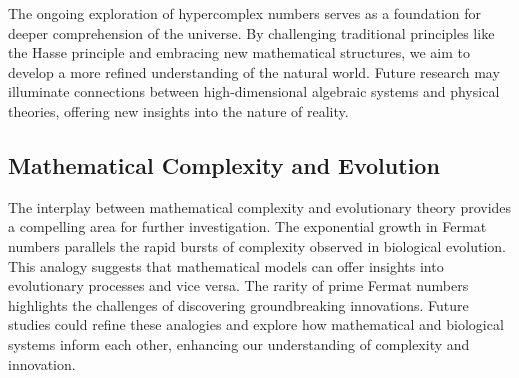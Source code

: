 \documentclass[12pt]{article}
\begin{document}
The ongoing exploration of hypercomplex numbers serves as a foundation for deeper comprehension of the universe. By challenging traditional principles like the Hasse principle and embracing new mathematical structures, we aim to develop a more refined understanding of the natural world. Future research may illuminate connections between high-dimensional algebraic systems and physical theories, offering new insights into the nature of reality.

\subsection{Mathematical Complexity and Evolution}

The interplay between mathematical complexity and evolutionary theory provides a compelling area for further investigation. The exponential growth in Fermat numbers parallels the rapid bursts of complexity observed in biological evolution. This analogy suggests that mathematical models can offer insights into evolutionary processes and vice versa. The rarity of prime Fermat numbers highlights the challenges of discovering groundbreaking innovations. Future studies could refine these analogies and explore how mathematical and biological systems inform each other, enhancing our understanding of complexity and innovation.
\end{document}
